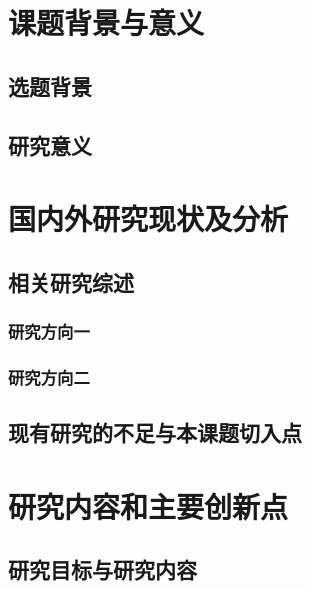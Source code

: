 \documentclass[UTF8,fontset=fandol,zihao=-4,oneside,openany]{ctexbook}
\newif\ifShowHints
\newcommand{\hint}[1]{\ifShowHints{\color{black!55}#1}\par\fi}
\begin{document}
\chapter{课题背景与意义}
\section{选题背景}
\hint{【在此说明研究所处的互动媒体设计与技术背景、具体应用场景、目标人群及现有问题。请用正式学术语言替换提示文字。】}

\section{研究意义}
\hint{【分别说明选题的理论意义、设计价值与工程应用价值，明确研究的边界与价值判断依据。】}

\chapter{国内外研究现状及分析}
\section{相关研究综述}
\hint{【按研究问题或技术路线梳理国内外研究，比较其方法、证据和局限。文献综述应进行归纳与分析，避免简单堆砌摘要。原模板要求查阅不少于20篇中外文献，书面报告不少于5000字。】}
\subsection{研究方向一}
\hint{【将本节标题替换为具体研究方向。用 \texttt{\string\cite\{reference-placeholder\}} 在正文中插入上标引用，如此处的占位引用\cite{reference-placeholder}；文末对应条目须替换为真实文献。】}
\subsection{研究方向二}
\hint{【总结另一相关研究方向，比较与本课题的关系。可按需要增加二级节标题。】}
\section{现有研究的不足与本课题切入点}
\hint{【从前文文献证据提出尚待解决的问题，并说明本课题如何回应这些问题。】}

\chapter{研究内容和主要创新点}
\section{研究目标与研究内容}
\hint{【明确总体目标，提炼3至4个可实施、可验证的研究点，并说明各研究点之间的关系。】}
\end{document}

